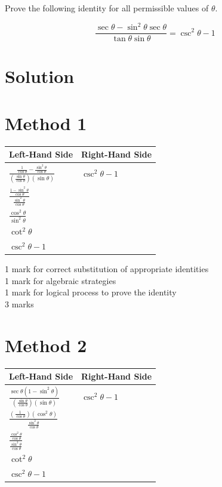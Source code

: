 \documentclass[10pt]{article}
\begin{document}
Prove the following identity for all permissible values of $\theta$.

$$
\frac{\sec \theta-\sin ^{2} \theta \sec \theta}{\tan \theta \sin \theta}=\csc ^{2} \theta-1
$$

\section*{Solution}
\section*{Method 1}
\begin{center}
\begin{tabular}{|l|l|}
\hline
Left-Hand Side & Right-Hand Side \\
\hline
$\frac{\frac{1}{\cos \theta}-\frac{\sin ^{2} \theta}{\cos \theta}}{\left(\frac{\sin \theta}{\cos \theta}\right)(\sin \theta)}$ & $\csc ^{2} \theta-1$ \\
\hline
$\frac{\frac{1-\sin ^{2} \theta}{\cos \theta}}{\frac{\sin ^{2} \theta}{\cos \theta}}$ &  \\
\hline
$\frac{\cos ^{2} \theta}{\sin ^{2} \theta}$ &  \\
\hline
$\cot ^{2} \theta$ &  \\
\hline
$\csc ^{2} \theta-1$ &  \\
\hline
\end{tabular}
\end{center}

1 mark for correct substitution of appropriate identities\\
1 mark for algebraic strategies\\
1 mark for logical process to prove the identity\\
3 marks

\section*{Method 2}
\begin{center}
\begin{tabular}{|l|l|}
\hline
Left-Hand Side & Right-Hand Side \\
\hline
$\frac{\sec \theta\left(1-\sin ^{2} \theta\right)}{\left(\frac{\sin \theta}{\cos \theta}\right)(\sin \theta)}$ & $\csc ^{2} \theta-1$ \\
\hline
$\frac{\left(\frac{1}{\cos \theta}\right)\left(\cos ^{2} \theta\right)}{\frac{\sin ^{2} \theta}{\cos \theta}}$ &  \\
\hline
$\frac{\frac{\cos ^{2} \theta}{\cos \theta}}{\frac{\sin ^{2} \theta}{\cos \theta}}$ &  \\
\hline
\( \cot ^{2} \theta \) &  \\
\hline
$\csc ^{2} \theta-1$ &  \\
\hline
\end{tabular}
\end{center}
\end{document}
